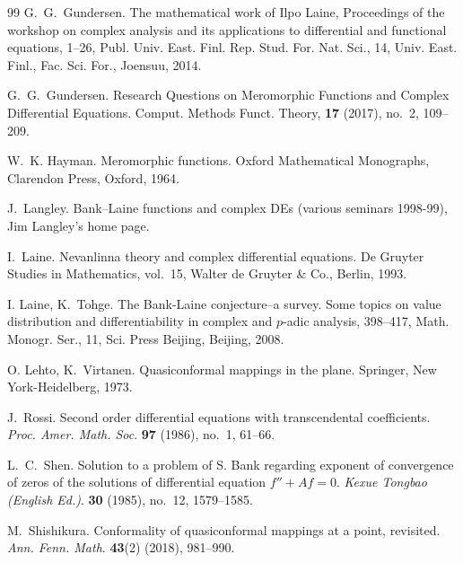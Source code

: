 \documentclass[12pt]{amsart}
\numberwithin{equation}{section}
\begin{document}
\begin{thebibliography}{99}
G.~G.~Gundersen. The mathematical work of Ilpo Laine, Proceedings of the workshop on complex analysis and its applications to differential and functional equations, 1--26, Publ. Univ. East. Finl. Rep. Stud. For. Nat. Sci., 14, Univ. East. Finl., Fac. Sci. For., Joensuu, 2014.

G.~G.~Gundersen. {Research Questions on Meromorphic Functions and Complex Differential Equations.} Comput. Methods Funct. Theory, {\bf 17} (2017), no.~2, 109--209.

W.~K. Hayman. Meromorphic functions. Oxford Mathematical Monographs, Clarendon Press, Oxford, 1964.


J.~Langley. Bank--Laine functions and complex DEs (various seminars 1998-99), Jim Langley's home page.

I.~Laine. Nevanlinna theory and complex differential equations. De Gruyter Studies in Mathematics, vol.~15, Walter de Gruyter \& Co., Berlin, 1993.

I. Laine, K.~Tohge. The Bank-Laine conjecture--a survey. Some topics on value distribution and differentiability in complex and $p$-adic analysis, 398--417, Math. Monogr. Ser., 11, Sci. Press Beijing, Beijing, 2008.

O. Lehto, K.~Virtanen. Quasiconformal mappings in the plane. Springer, New York-Heidelberg, 1973.

J.~Rossi. Second order differential equations with transcendental coefficients. {\it Proc. Amer. Math. Soc}. {\bf 97} (1986), no.~1, 61--66.

L.~C.~Shen. Solution to a problem of S. Bank regarding exponent of convergence of zeros of the solutions of differential equation $f''+Af=0$. {\it Kexue Tongbao (English Ed.)}. {\bf 30} (1985), no.~12, 1579--1585.

M.~Shishikura. Conformality of quasiconformal mappings at a point, revisited. {\it Ann. Fenn. Math}. {\bf 43}(2) (2018), 981--990.


\end{thebibliography}
\end{document}
